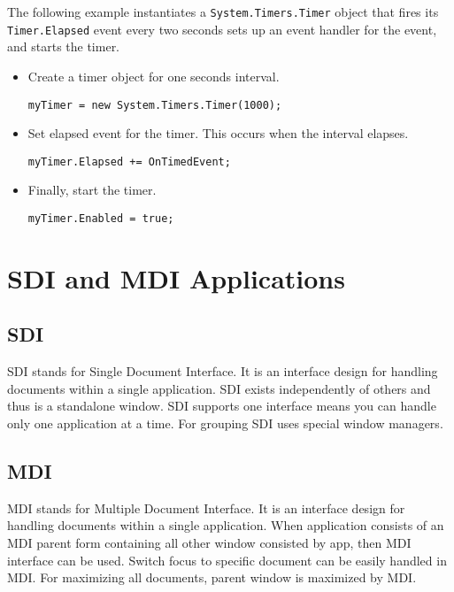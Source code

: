 The following example instantiates a \texttt{System.Timers.Timer} object that fires its \texttt{Timer.Elapsed} event every two seconds sets up an event handler for the event, and starts the timer.

\begin{itemize}
\item Create a timer object for one seconds interval.
\begin{lstlisting}[numbers=none]
myTimer = new System.Timers.Timer(1000);
\end{lstlisting}
	
\item Set elapsed event for the timer. This occurs when the interval elapses.
\begin{lstlisting}[numbers=none]
myTimer.Elapsed += OnTimedEvent;
\end{lstlisting}
	
\item Finally, start the timer.
\begin{lstlisting}[numbers=none]
myTimer.Enabled = true;
\end{lstlisting}
\end{itemize}



\section{SDI and MDI Applications}

\subsection{SDI}
SDI stands for Single Document Interface. It is an interface design for handling documents within a
single application. SDI exists independently of others and thus is a standalone window. SDI
supports one interface means you can handle only one application at a time. For grouping SDI uses
special window managers.

\subsection{MDI}
MDI stands for Multiple Document Interface. It is an interface design for handling documents
within a single application. When application consists of an MDI parent form containing all other
window consisted by app, then MDI interface can be used. Switch focus to specific document can
be easily handled in MDI. For maximizing all documents, parent window is maximized by MDI.

